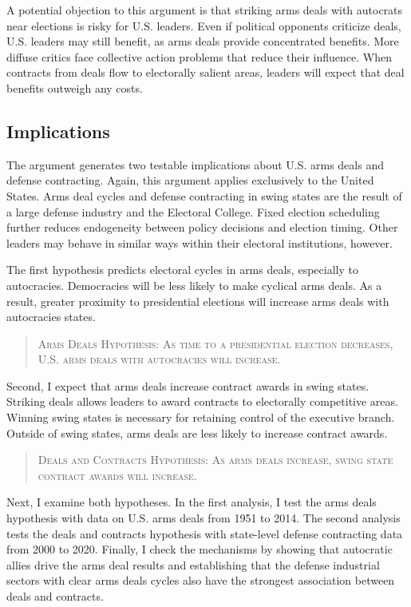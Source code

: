 \documentclass[12pt]{article}
\begin{document}
A potential objection to this argument is that striking arms deals with autocrats near elections is risky for U.S. leaders. 
Even if political opponents criticize deals, U.S. leaders may still benefit, as arms deals provide concentrated benefits.
More diffuse critics face collective action problems that reduce their influence.
When contracts from deals flow to electorally salient areas, leaders will expect that deal benefits outweigh any costs. 



\subsection{Implications}


The argument generates two testable implications about U.S. arms deals and defense contracting. 
Again, this argument applies exclusively to the United States.  
Arms deal cycles and defense contracting in swing states are the result of a large defense industry and the Electoral College. 
Fixed election scheduling further reduces endogeneity between policy decisions and election timing. 
Other leaders may behave in similar ways within their electoral institutions, however. 


The first hypothesis predicts electoral cycles in arms deals, especially to autocracies.
Democracies will be less likely to make cyclical arms deals. 
As a result, greater proximity to presidential elections will increase arms deals with autocracies states. 


\begin{quote}
\textsc{Arms Deals Hypothesis: As time to a presidential election decreases, U.S. arms deals with autocracies will increase.}
\end{quote}


Second, I expect that arms deals increase contract awards in swing states.
Striking deals allows leaders to award contracts to electorally competitive areas. 
Winning swing states is necessary for retaining control of the executive branch. 
Outside of swing states, arms deals are less likely to increase contract awards. 


\begin{quote}
\textsc{Deals and Contracts Hypothesis: As arms deals increase, swing state contract awards will increase.}
\end{quote}


Next, I examine both hypotheses. 
In the first analysis, I test the arms deals hypothesis with data on U.S. arms deals from 1951 to 2014.  
The second analysis tests the deals and contracts hypothesis with state-level defense contracting data from 2000 to 2020. 
Finally, I check the mechanisms by showing that autocratic allies drive the arms deal results and establishing that the defense industrial sectors with clear arms deals cycles also have the strongest association between deals and contracts. 
\end{document}
